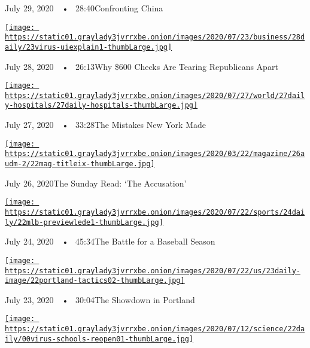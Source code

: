 July 29, 2020~~•~ 28:40Confronting China

\href{https://www.nytimes3xbfgragh.onion/2020/07/28/podcasts/the-daily/unemployment-benefits-coronavirus.html?action=click\&module=audio-series-bar\&region=header\&pgtype=Article}{\texttt{[image: https://static01.graylady3jvrrxbe.onion/images/2020/07/23/business/28daily/23virus-uiexplain1-thumbLarge.jpg]}}

July 28, 2020~~•~ 26:13Why \$600 Checks Are Tearing Republicans Apart

\href{https://www.nytimes3xbfgragh.onion/2020/07/27/podcasts/the-daily/new-york-hospitals-covid.html?action=click\&module=audio-series-bar\&region=header\&pgtype=Article}{\texttt{[image: https://static01.graylady3jvrrxbe.onion/images/2020/07/27/world/27daily-hospitals/27daily-hospitals-thumbLarge.jpg]}}

July 27, 2020~~•~ 33:28The Mistakes New York Made

\href{https://www.nytimes3xbfgragh.onion/2020/07/26/podcasts/the-daily/the-accusation-the-sunday-read.html?action=click\&module=audio-series-bar\&region=header\&pgtype=Article}{\texttt{[image: https://static01.graylady3jvrrxbe.onion/images/2020/03/22/magazine/26audm-2/22mag-titleix-thumbLarge.jpg]}}

July 26, 2020The Sunday Read: `The Accusation'

\href{https://www.nytimes3xbfgragh.onion/2020/07/24/podcasts/the-daily/mlb-baseball-season-coronavirus.html?action=click\&module=audio-series-bar\&region=header\&pgtype=Article}{\texttt{[image: https://static01.graylady3jvrrxbe.onion/images/2020/07/22/sports/24daily/22mlb-previewlede1-thumbLarge.jpg]}}

July 24, 2020~~•~ 45:34The Battle for a Baseball Season

\href{https://www.nytimes3xbfgragh.onion/2020/07/23/podcasts/the-daily/portland-protests.html?action=click\&module=audio-series-bar\&region=header\&pgtype=Article}{\texttt{[image: https://static01.graylady3jvrrxbe.onion/images/2020/07/22/us/23daily-image/22portland-tactics02-thumbLarge.jpg]}}

July 23, 2020~~•~ 30:04The Showdown in Portland

\href{https://www.nytimes3xbfgragh.onion/2020/07/22/podcasts/the-daily/school-reopenings-coronavirus.html?action=click\&module=audio-series-bar\&region=header\&pgtype=Article}{\texttt{[image: https://static01.graylady3jvrrxbe.onion/images/2020/07/12/science/22daily/00virus-schools-reopen01-thumbLarge.jpg]}}

